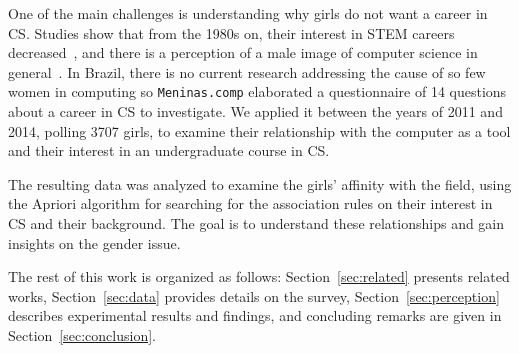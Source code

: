 One of the main challenges is understanding why girls do not want a career in CS. Studies show that from the 1980s on, their interest in STEM careers decreased~\cite{Abbate_2012}, and there is a perception of a male image of computer science in general~\cite{Mercier_2006}. In Brazil, there is no current research addressing the cause of so few women in computing so \texttt{Meninas.comp} elaborated a questionnaire of 14 questions about a career in CS to investigate. We applied it between the years of 2011 and 2014,  polling 3707 girls, to examine their relationship with the computer as a tool and their interest in an undergraduate course in CS.

The resulting data was analyzed to examine the girls' affinity with the field, using the Apriori algorithm for searching for the association rules on their interest in CS and their background. The goal is to understand these relationships and gain insights on the gender issue.

The rest of this work is organized as follows: Section~\ref{sec:related} presents related works, Section~\ref{sec:data} provides details on the survey, Section~\ref{sec:perception} describes experimental results and findings, and concluding remarks are given in Section~\ref{sec:conclusion}.
